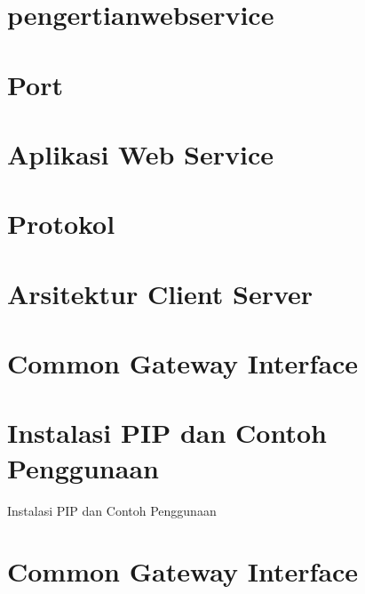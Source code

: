 \documentclass{wileySix}
\begin{document}
\chapter[Pengertian Web Service]
{pengertianwebservice}


\chapter[Port]
{Port}



\chapter[Aplikasi Web Service]
{Aplikasi Web Service}


\chapter[Protokol]
{Protokol}


\chapter[Arsitektur Client Server]
{Arsitektur Client Server}


\chapter[Common Gateway Interface]
{Common Gateway Interface}


\chapter{Instalasi PIP dan Contoh Penggunaan}
{Instalasi PIP dan Contoh Penggunaan}


%

\chapter[Pemanggilan Modul]
{Common Gateway Interface}

\end{document}
